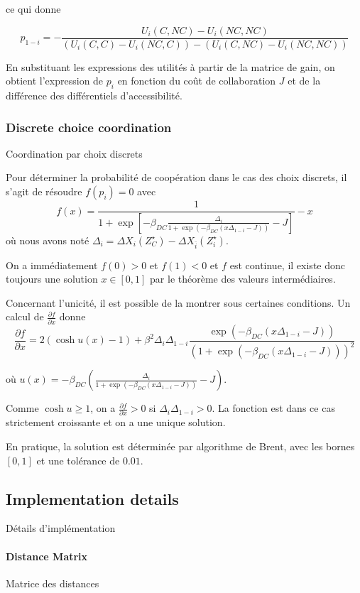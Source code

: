 ce qui donne

\[
p_{1-i} = - \frac{U_i(C,NC) - U_i(NC,NC)}{\left(U_i(C,C) - U_i(NC,C)\right) - \left(U_i(C,NC) - U_i(NC,NC)\right)}
\]

En substituant les expressions des utilités à partir de la matrice de gain, on obtient l'expression de $p_i$ en fonction du coût de collaboration $J$ et de la différence des différentiels d'accessibilité.


\subsubsection{Discrete choice coordination}{Coordination par choix discrets}


Pour déterminer la probabilité de coopération dans le cas des choix discrets, il s'agit de résoudre $f(p_i) = 0$ avec
\[
f(x) = \frac{1}{1+\exp\left[-\beta_{DC}\frac{\Delta_i}{1 + \exp(-\beta_{DC}(x \Delta_{1-i} - J))} - J\right]} - x
\]
où nous avons noté $\Delta_i = \Delta X_{i}(Z^{\star}_{C}) - \Delta X_{\bar{i}}(Z^{\star}_{i})$.

On a immédiatement $f(0) > 0 $ et $f(1) < 0$ et $f$ est continue, il existe donc toujours une solution $x\in [0,1]$ par le théorème des valeurs intermédiaires.

Concernant l'unicité, il est possible de la montrer sous certaines conditions. Un calcul de $\frac{\partial f}{\partial x}$ donne 
\[
\frac{\partial f}{\partial x} = 2 (\cosh u(x) - 1) + \beta^2 \Delta_i \Delta_{1-i} \frac{\exp(-\beta_{DC}(x \Delta_{1-i} - J))}{(1 + \exp(-\beta_{DC}(x \Delta_{1-i} - J)))^2}
\]

où $u(x) = -\beta_{DC} (\frac{\Delta_i}{1 + \exp(-\beta_{DC}(x \Delta_{1-i} - J))} - J)$.

Comme $\cosh u \geq 1$, on a $\frac{\partial f}{\partial x} > 0$ si $\Delta_i \Delta_{1-i} > 0$. La fonction est dans ce cas strictement croissante et on a une unique solution.

En pratique, la solution est déterminée par algorithme de Brent, avec les bornes $[0,1]$ et une tolérance de $0.01$.


\subsection{Implementation details}{Détails d'implémentation}


\paragraph{Distance Matrix}{Matrice des distances}

